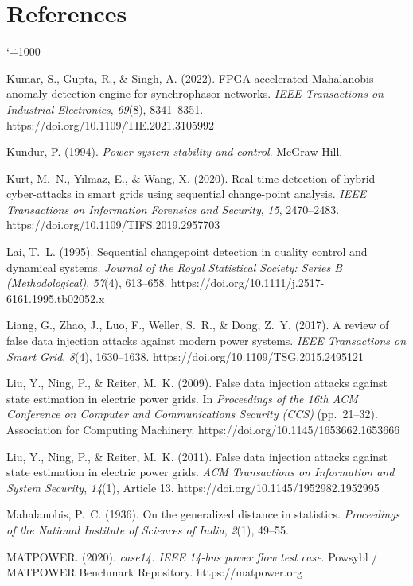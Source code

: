 \documentclass[11pt,a4paper]{report}
\makeatletter
\renewcommand{\bibname}{References}
\renewenvironment{thebibliography}[1]{%
  \chapter*{\bibname}%
  \addcontentsline{toc}{chapter}{\bibname}%
  \list{}{%
    \setlength{\labelwidth}{0pt}%
    \setlength{\labelsep}{0pt}%
    \setlength{\leftmargin}{0.35in}%
    \setlength{\itemindent}{-0.35in}%
    \setlength{\itemsep}{6pt}%
    \setlength{\parsep}{0pt}%
    \usecounter{enumiv}%
    \let\p@enumiv\@empty
    \renewcommand\theenumiv{\@arabic\c@enumiv}%
  }%
  \sloppy\clubpenalty4000\widowpenalty4000%
  \sfcode`\.=1000\relax
}{%
  \endlist
}
\makeatother
\begin{document}
\begin{thebibliography}{99}
Kumar, S., Gupta, R., \& Singh, A. (2022). FPGA-accelerated Mahalanobis anomaly detection engine for synchrophasor networks. \textit{IEEE Transactions on Industrial Electronics}, \textit{69}(8), 8341--8351. https://doi.org/10.1109/TIE.2021.3105992

Kundur, P. (1994). \textit{Power system stability and control}. McGraw-Hill.

Kurt, M.~N., Y{\i}lmaz, E., \& Wang, X. (2020). Real-time detection of hybrid cyber-attacks in smart grids using sequential change-point analysis. \textit{IEEE Transactions on Information Forensics and Security}, \textit{15}, 2470--2483. https://doi.org/10.1109/TIFS.2019.2957703

Lai, T.~L. (1995). Sequential changepoint detection in quality control and dynamical systems. \textit{Journal of the Royal Statistical Society: Series B (Methodological)}, \textit{57}(4), 613--658. https://doi.org/10.1111/j.2517-6161.1995.tb02052.x

Liang, G., Zhao, J., Luo, F., Weller, S.~R., \& Dong, Z.~Y. (2017). A review of false data injection attacks against modern power systems. \textit{IEEE Transactions on Smart Grid}, \textit{8}(4), 1630--1638. https://doi.org/10.1109/TSG.2015.2495121

Liu, Y., Ning, P., \& Reiter, M.~K. (2009). False data injection attacks against state estimation in electric power grids. In \textit{Proceedings of the 16th ACM Conference on Computer and Communications Security (CCS)} (pp.~21--32). Association for Computing Machinery. https://doi.org/10.1145/1653662.1653666

Liu, Y., Ning, P., \& Reiter, M.~K. (2011). False data injection attacks against state estimation in electric power grids. \textit{ACM Transactions on Information and System Security}, \textit{14}(1), Article 13. https://doi.org/10.1145/1952982.1952995

Mahalanobis, P.~C. (1936). On the generalized distance in statistics. \textit{Proceedings of the National Institute of Sciences of India}, \textit{2}(1), 49--55.

MATPOWER. (2020). \textit{case14: IEEE 14-bus power flow test case}. Powsybl / MATPOWER Benchmark Repository. https://matpower.org


\end{thebibliography}
\end{document}
